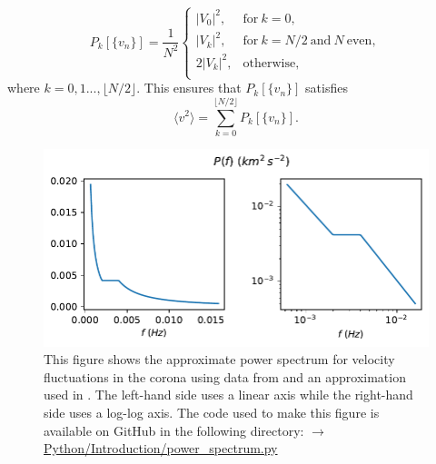 \begin{equation}
    \label{eq:discrete_power_spectrum_definition}
    P_k[\{v_n\}] = \frac{1}{N^2}\begin{cases}
    |V_0|^2, & \text{for}\ k=0,\\
    |V_k|^2, & \text{for}\ k=N/2\ \text{and}\ N\ \text{even},\\
    2|V_k|^2, & \text{otherwise},\\
    \end{cases}
\end{equation}
where $k=0,1...,\lfloor N / 2\rfloor$. This ensures that $P_k[\{v_n\}]$ satisfies
\begin{equation}
    \langle v^2 \rangle = \sum_{k=0}^{\lfloor N / 2 \rfloor}P_k[\{v_n\}].
\end{equation}

\begin{figure}
    \vspace{-20pt}
    \centering
    \includegraphics[width=\textwidth]{figures/introduction/power_spectrum_morton.pdf}
    \vspace{-35pt}
    \caption{This figure shows the approximate power spectrum for velocity fluctuations in the corona using data from \citet{Morton2016} and an approximation used in \citet{Pagano2019}. The left-hand side uses a linear axis while the right-hand side uses a log-log axis. The code used to make this figure is available on GitHub in the following directory:\newline
    \href{https://github.com/aleksyprok/apkp_thesis/blob/main/Python/Introduction/power_spectrum.py}{$\rightarrow$ Python/Introduction/power\_spectrum.py}}
    \vspace{-10pt}
    \label{fig:power_spectrum_morton}
\end{figure}

